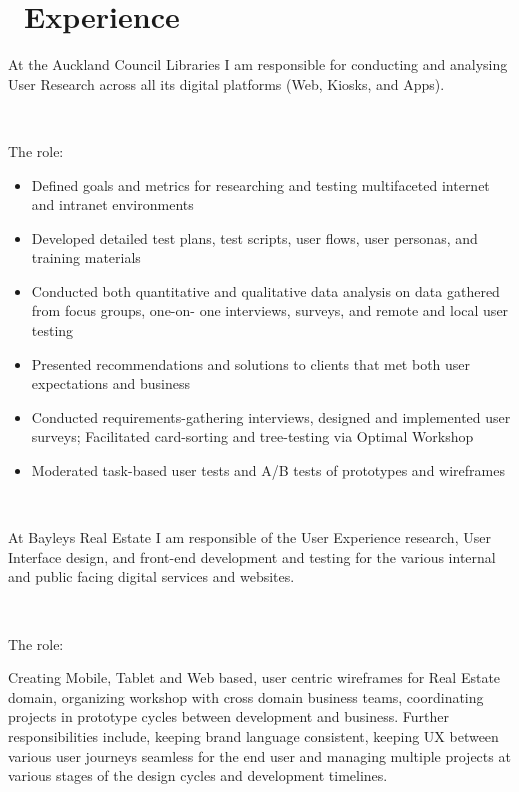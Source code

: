 \documentclass{resume}
\begin{document}
\section{\faUsers\ Experience}
  At the Auckland Council Libraries I am responsible for conducting and analysing User Research across all its digital platforms (Web, Kiosks, and Apps).\par
  ~\par
  {The role:}\par
  \begin{itemize}
    \item Defined goals and metrics for researching and testing multifaceted internet and intranet environments
    \item Developed detailed test plans, test scripts, user flows, user personas, and training materials
    \item Conducted both quantitative and qualitative data analysis on data gathered from focus groups, one-on- one interviews, surveys, and remote and local user testing
    \item Presented recommendations and solutions to clients that met both user expectations and business
    \item Conducted requirements-gathering interviews, designed and implemented user surveys; Facilitated card-sorting and tree-testing via Optimal Workshop
    \item Moderated task-based user tests and A/B tests of prototypes and wireframes
  \end{itemize}
  ~\par
{}
  At Bayleys Real Estate I am responsible of the User Experience research, User Interface design, and front-end development and testing for the various internal and public facing digital services and websites.\par
  ~\par
  {The role:}\par
  Creating Mobile, Tablet and Web based, user centric wireframes for Real Estate domain, organizing workshop with cross domain business teams, coordinating projects in prototype cycles between development and business. Further responsibilities include, keeping brand language consistent, keeping UX between various user journeys seamless for the end user and managing multiple projects at various stages of the design cycles and development timelines.\par
\end{document}
